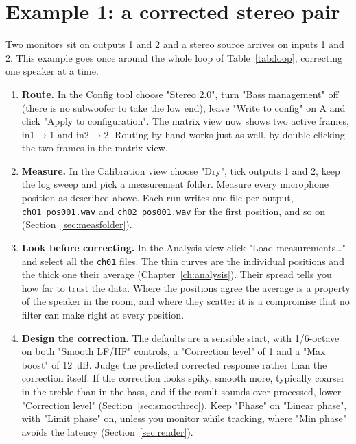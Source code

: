 \section{Example 1: a corrected stereo pair}\label{sec:ex-stereo}

Two monitors sit on outputs 1 and 2 and a stereo source arrives on inputs 1 and 2. This example goes once around the whole loop of Table~\ref{tab:loop}, correcting one speaker at a time.

\begin{enumerate}[nosep]
  \item \textbf{Route.} In the Config tool choose "Stereo 2.0", turn "Bass management" off (there is no subwoofer to take the low end), leave "Write to config" on A and click "Apply to configuration". The matrix view now shows two active frames, in1$\rightarrow$1 and in2$\rightarrow$2. Routing by hand works just as well, by double-clicking the two frames in the matrix view.
  \item \textbf{Measure.} In the Calibration view choose "Dry", tick outputs 1 and 2, keep the log sweep and pick a measurement folder. Measure every microphone position as described above. Each run writes one file per output, \texttt{ch01\_pos001.wav} and \texttt{ch02\_pos001.wav} for the first position, and so on (Section~\ref{sec:measfolder}).
  \item \textbf{Look before correcting.} In the Analysis view click "Load measurements\ldots" and select all the \texttt{ch01} files. The thin curves are the individual positions and the thick one their average (Chapter~\ref{ch:analysis}). Their spread tells you how far to trust the data. Where the positions agree the average is a property of the speaker in the room, and where they scatter it is a compromise that no filter can make right at every position.
  \item \textbf{Design the correction.} The defaults are a sensible start, with 1/6-octave  on both "Smooth LF/HF" controls, a "Correction level" of 1 and a "Max boost" of \SI{12}{\dB}. Judge the predicted corrected response rather than the correction itself. If the correction looks spiky, smooth more, typically coarser in the treble than in the bass, and if the result sounds over-processed, lower "Correction level" (Section~\ref{sec:smoothrec}). Keep "Phase" on "Linear phase", with "Limit phase" on, unless you monitor while tracking, where "Min phase" avoids the latency (Section~\ref{sec:render}).

\end{enumerate}
